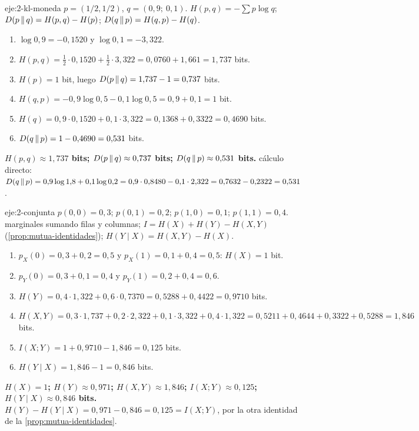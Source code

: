 \begin{solucion}{eje:2-kl-moneda}
\datos $p=(1/2,1/2)$, $q=(0{,}9;\ 0{,}1)$.
\planteamiento $H(p,q)=-\sum p\log q$; $D(p\,\|\,q)=H(p,q)-H(p)$; $D(q\,\|\,p)=H(q,p)-H(q)$.
\pasos
\begin{enumerate}[label=\arabic*.]
  \item $\log 0{,}9=-0{,}1520$ y $\log 0{,}1=-3{,}322$.
  \item $H(p,q)=\tfrac12\cdot 0{,}1520+\tfrac12\cdot 3{,}322=0{,}0760+1{,}661=1{,}737$ bits.
  \item $H(p)=1$ bit, luego $D(p\,\|\,q)=1{,}737-1=0{,}737$ bits.
  \item $H(q,p)=-0{,}9\log0{,}5-0{,}1\log 0{,}5=0{,}9+0{,}1=1$ bit.
  \item $H(q)=0{,}9\cdot 0{,}1520+0{,}1\cdot 3{,}322=0{,}1368+0{,}3322=0{,}4690$ bits.
  \item $D(q\,\|\,p)=1-0{,}4690=0{,}531$ bits.
\end{enumerate}
\resultado \textbf{$H(p,q)\approx 1{,}737$ bits; $D(p\,\|\,q)\approx 0{,}737$ bits; $D(q\,\|\,p)\approx 0{,}531$ bits.}
\comprobacion cálculo directo: $D(q\,\|\,p)=0{,}9\log 1{,}8+0{,}1\log 0{,}2=0{,}9\cdot 0{,}8480-0{,}1\cdot 2{,}322=0{,}7632-0{,}2322=0{,}531$.
\end{solucion}

\begin{solucion}{eje:2-conjunta}
\datos $p(0,0)=0{,}3$; $p(0,1)=0{,}2$; $p(1,0)=0{,}1$; $p(1,1)=0{,}4$.
\planteamiento marginales sumando filas y columnas; $I=H(X)+H(Y)-H(X,Y)$ (\cref{prop:mutua-identidades}); $H(Y\mid X)=H(X,Y)-H(X)$.
\pasos
\begin{enumerate}[label=\arabic*.]
  \item $p_X(0)=0{,}3+0{,}2=0{,}5$ y $p_X(1)=0{,}1+0{,}4=0{,}5$: $H(X)=1$ bit.
  \item $p_Y(0)=0{,}3+0{,}1=0{,}4$ y $p_Y(1)=0{,}2+0{,}4=0{,}6$.
  \item $H(Y)=0{,}4\cdot 1{,}322+0{,}6\cdot 0{,}7370=0{,}5288+0{,}4422=0{,}9710$ bits.
  \item $H(X,Y)=0{,}3\cdot 1{,}737+0{,}2\cdot 2{,}322+0{,}1\cdot 3{,}322+0{,}4\cdot 1{,}322=0{,}5211+0{,}4644+0{,}3322+0{,}5288=1{,}846$ bits.
  \item $I(X;Y)=1+0{,}9710-1{,}846=0{,}125$ bits.
  \item $H(Y\mid X)=1{,}846-1=0{,}846$ bits.
\end{enumerate}
\resultado \textbf{$H(X)=1$; $H(Y)\approx 0{,}971$; $H(X,Y)\approx 1{,}846$; $I(X;Y)\approx 0{,}125$; $H(Y\mid X)\approx 0{,}846$ bits.}
\comprobacion $H(Y)-H(Y\mid X)=0{,}971-0{,}846=0{,}125=I(X;Y)$, por la otra identidad de la \cref{prop:mutua-identidades}.
\end{solucion}

